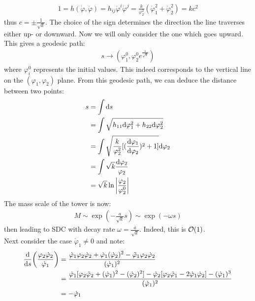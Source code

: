 \begin{align}
    1 = h(\dot \varphi, \dot \varphi) = h_{ij} \dot \varphi^{i} \dot \varphi^{j} = \frac{k}{\varphi_{2}^{2}} (\dot \varphi_{1} ^{2} + \dot \varphi_{2} ^{2}) = kc^{2}
\end{align}
thus $c= \pm \frac{1}{\sqrt{k}}$. The choice of the sign determines the direction the line traverses either up- or downward. Now we will only consider the one which goes upward. This gives a geodesic path:
\begin{align}
    s \rightarrow (\varphi_{1}^{0}, \varphi_{2}^{0} e^{\frac{s}{\sqrt{k}}})
\end{align}
where $\varphi_{i}^{0}$ represents the initial values. This indeed corresponds to the vertical line on the $(\varphi_{1}, \varphi_{2})$ plane. From this geodesic path, we can deduce the distance between two points:
\begin{align}
    \begin{split}
    s &= \int \dd s \\
    &= \int \sqrt{h_{11} \dd \varphi_{1} ^{2} + h_{22} \dd \varphi_{2} ^{2}} \\
    &= \int \sqrt{\frac{k}{\varphi_{2} ^{2}}[(\dv{\varphi_{1}}{\varphi_2})^{2} + 1]} \dd \varphi_{2} \\
    &= \int \sqrt{k}\frac{\dd \varphi_{2}}{\varphi_{2}} \\
    &= \sqrt{k} \ln \abs{\frac{\varphi_{2}}{\varphi_{2}^{0}}}
    \end{split}
\end{align}
The mass scale of the tower is now:
\begin{align}
    M \sim \exp (-\frac{a}{\sqrt{k}}s) \sim \exp (-\omega s)
\end{align}
then leading to SDC with decay rate $\omega = \frac{a}{\sqrt{k}}$. Indeed, this is $\order {1}$. \\
\indent Next consider the case $\dot \varphi_{1} \neq 0$ and note:
\begin{align}
    \begin{split}
    \dv{s}(\frac{\varphi_{2} \dot \varphi_{2}}{\dot \varphi _{1}} ) &= \frac{\dot \varphi_{1} \varphi_{2} \dot \varphi_{2} + \dot \varphi_{1} (\dot \varphi_{2})^{2} - \ddot \varphi_{1} \varphi_{2} \dot \varphi_{2}}{(\dot \varphi_{1})^{2}} \\
    & = \frac{\dot \varphi_{1} [\varphi_{2} \ddot \varphi_{2} + (\dot \varphi_{1})^{2} - (\dot \varphi_{2})^{2} ] - \dot \varphi_{2} [\varphi_{2} \ddot \varphi_{1} -2\dot \varphi_{1} \dot \varphi_{2}] -(\dot \varphi_{1})^{3}}{(\dot \varphi_{1})^{2}} \\
    &= -\dot \varphi_{1}
    \end{split} 
\end{align}
